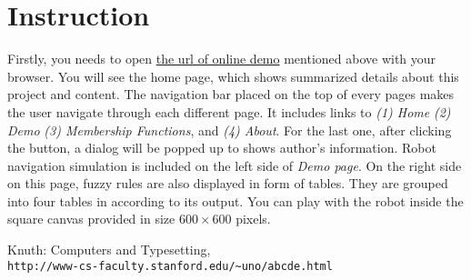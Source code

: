 \documentclass[paper=a4, fontsize=11pt]{scrartcl}
\numberwithin{equation}{section}		%
\numberwithin{figure}{section}			%
\numberwithin{table}{section}				%
\begin{document}
	\section{Instruction}
	Firstly, you needs to open \href{http://tmwatchanan.github.io/fuzzy-robot-navigation}{the url of online demo} mentioned above with your browser. You will see the home page, which shows summarized details about this project and content. The navigation bar placed on the top of every pages makes the user navigate through each different page. It includes links to \textit{(1) Home} \textit{(2) Demo} \textit{(3) Membership Functions}, and \textit{(4) About}. For the last one, after clicking the button, a dialog will be popped up to shows author's information.
	\linebreak \linebreak
	Robot navigation simulation is included on the left side of \textit{Demo page}. On the right side on this page, fuzzy rules are also displayed in form of tables. They are grouped into four tables in according to its output. You can play with the robot inside the square canvas provided in size $600 \times 600$ pixels. 
	
	\begin{thebibliography}{9}
		Knuth: Computers and Typesetting,
		\\\texttt{http://www-cs-faculty.stanford.edu/\~{}uno/abcde.html}
	\end{thebibliography}
	
	
\end{document}
